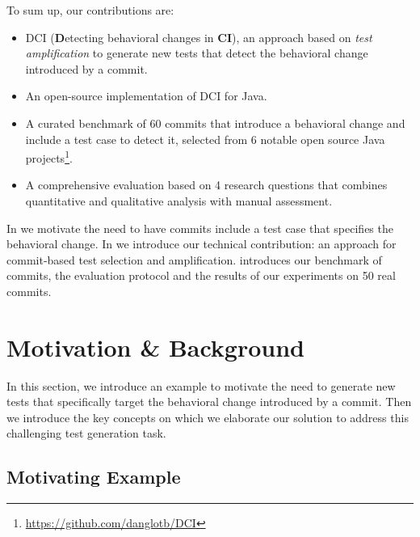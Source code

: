 To sum up, our contributions are:
\begin{itemize}
\item DCI (\textbf{D}etecting behavioral changes in \textbf{CI}), an approach based on \emph{test amplification} to generate new tests that detect the behavioral change introduced by a commit.
\item An open-source implementation of DCI for Java.
\item A curated benchmark of 60 commits that introduce a behavioral change and include a test case to detect it, selected from 6 notable open source Java projects\footnote{\url{https://github.com/danglotb/DCI}}.
\item A comprehensive evaluation based on 4 research questions that combines quantitative and qualitative analysis with manual assessment.
\end{itemize}

In  we motivate the need to have commits include a test case that specifies the behavioral change. In  we introduce our technical contribution: an approach for commit-based test selection and amplification.  introduces our benchmark of commits, the evaluation protocol and the results of our experiments on 50 real commits. 

\section{Motivation \& Background}
\label{sec:background}

In this section, we introduce an example to motivate the need to generate new tests that specifically target the behavioral change introduced by a commit.
Then we introduce the key concepts on which we elaborate our solution to address this challenging test generation task.

\subsection{Motivating Example}

